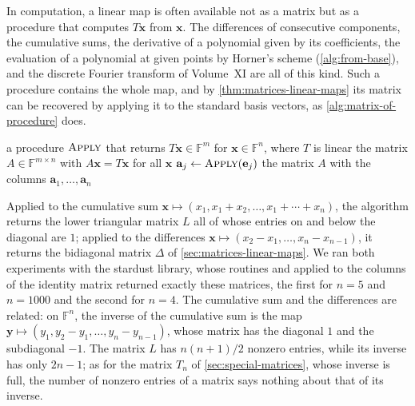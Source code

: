 In computation, a linear map is often available not as a matrix but as a procedure that computes $T\mathbf x$ from $\mathbf x$. The differences of consecutive components, the cumulative sums, the derivative of a polynomial given by its coefficients, the evaluation of a polynomial at given points by Horner's scheme (\cref{alg:from-base}), and the discrete Fourier transform of Volume~XI are all of this kind. Such a procedure contains the whole map, and by \cref{thm:matrices-linear-maps} its matrix can be recovered by applying it to the standard basis vectors, as \cref{alg:matrix-of-procedure} does.

\begin{algorithm}
\begin{algorithmic}[1]
\Require a procedure $\textsc{Apply}$ that returns $T\mathbf x\in\mathbb F^m$ for $\mathbf x\in\mathbb F^n$, where $T$ is linear
\Ensure the matrix $A\in\mathbb F^{m\times n}$ with $A\mathbf x=T\mathbf x$ for all $\mathbf x$
  \State $\mathbf a_j\gets\textsc{Apply}(\mathbf e_j)$ 
\EndFor
\State \Return the matrix $A$ with the columns $\mathbf a_1,\ldots,\mathbf a_n$
\end{algorithmic}
\caption{The matrix of a linear map given by a procedure (\cref{thm:matrices-linear-maps}). It calls the procedure $n$ times, so it costs $n$ times the cost of one application, and it stores $mn$ numbers.}
\label{alg:matrix-of-procedure}
\end{algorithm}

Applied to the cumulative sum $\mathbf x\mapsto(x_1,x_1+x_2,\ldots,x_1+\cdots+x_n)$, the algorithm returns the lower triangular matrix $L$ all of whose entries on and below the diagonal are $1$; applied to the differences $\mathbf x\mapsto(x_2-x_1,\ldots,x_n-x_{n-1})$, it returns the bidiagonal matrix $\Delta$ of \cref{sec:matrices-linear-maps}. We ran both experiments with the stardust library, whose routines  and  applied to the columns of the identity matrix returned exactly these matrices, the first for $n=5$ and $n=1000$ and the second for $n=4$. The cumulative sum and the differences are related: on $\mathbb F^n$, the inverse of the cumulative sum is the map $\mathbf y\mapsto(y_1,y_2-y_1,\ldots,y_n-y_{n-1})$, whose matrix has the diagonal $1$ and the subdiagonal $-1$. The matrix $L$ has $n(n+1)/2$ nonzero entries, while its inverse has only $2n-1$; as for the matrix $T_n$ of \cref{sec:special-matrices}, whose inverse is full, the number of nonzero entries of a matrix says nothing about that of its inverse.

